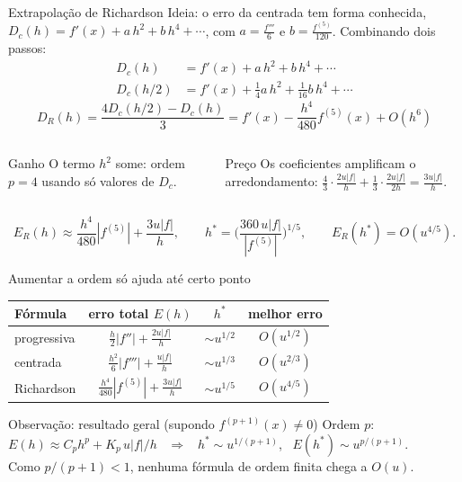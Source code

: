 \documentclass[aspectratio=169,11pt]{beamer}
\begin{document}
\begin{frame}{Extrapolação de Richardson}
  Ideia: o erro da centrada tem forma conhecida, $D_c(h) = f'(x) + a\,h^2 + b\,h^4 + \cdots$,
  com $a=\tfrac{f'''}{6}$ e $b=\tfrac{f^{(5)}}{120}$. Combinando dois passos:
  \[
    \begin{aligned}
      D_c(h)   &= f'(x) + a\,h^2 + b\,h^4 + \cdots\\
      D_c(h/2) &= f'(x) + \tfrac14 a\,h^2 + \tfrac1{16} b\,h^4 + \cdots
    \end{aligned}
  \]
  \[
    D_R(h) = \frac{4D_c(h/2)-D_c(h)}{3} = f'(x) - \frac{h^4}{480}f^{(5)}(x) + O(h^6)
  \]
  \begin{columns}[T]
    \begin{exampleblock}{Ganho}
      O termo $h^2$ some: ordem $p=4$ usando só valores de $D_c$.
    \end{exampleblock}
    \begin{alertblock}{Preço}
      Os coeficientes amplificam o arredondamento:
      $\tfrac43\cdot\tfrac{2u|f|}{h} + \tfrac13\cdot\tfrac{2u|f|}{2h} = \tfrac{3u|f|}{h}$.
    \end{alertblock}
  \end{columns}
  \[
    E_R(h)\approx \frac{h^4}{480}|f^{(5)}| + \frac{3u|f|}{h},\qquad
    h^\ast = \Big(\frac{360\,u|f|}{|f^{(5)}|}\Big)^{1/5},\qquad E_R(h^\ast) = O(u^{4/5}).
  \]
\end{frame}

\begin{frame}{Aumentar a ordem só ajuda até certo ponto}
  \renewcommand{\arraystretch}{1.5}
  \centering
  \begin{tabular}{lccc}
    \toprule
    Fórmula & erro total $E(h)$ & $h^\ast$ & melhor erro \\
    \midrule
    progressiva & $\frac{h}{2}|f''| + \frac{2u|f|}{h}$ & $\sim u^{1/2}$ & $O(u^{1/2})$ \\
    centrada & $\frac{h^2}{6}|f'''| + \frac{u|f|}{h}$ & $\sim u^{1/3}$ & $O(u^{2/3})$ \\
    Richardson & $\frac{h^4}{480}|f^{(5)}| + \frac{3u|f|}{h}$ & $\sim u^{1/5}$ & $O(u^{4/5})$ \\
    \bottomrule
  \end{tabular}
  \vspace{1em}

  \begin{block}{Observação: resultado geral (supondo $f^{(p+1)}(x)\ne0$)}
    Ordem $p$: \ $E(h)\approx C_ph^p + K_p\,u|f|/h$ \ $\Rightarrow$ \ $h^\ast\sim u^{1/(p+1)}$, \ $E(h^\ast)\sim u^{p/(p+1)}$.
    \\[0.3em]
    Como $p/(p+1)<1$, \alert{nenhuma} fórmula de ordem finita chega a $O(u)$.
  \end{block}
\end{frame}
\end{document}
